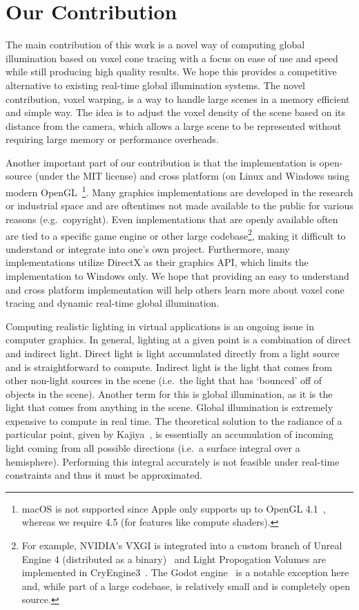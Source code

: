 \section{Our Contribution}
The main contribution of this work is a novel way of computing global illumination based on voxel cone tracing with a focus on ease of use and speed while still producing high quality results. We hope this provides a competitive alternative to existing real-time global illumination systems. The novel contribution, voxel warping, is a way to handle large scenes in a memory efficient and simple way. The idea is to adjust the voxel density of the scene based on its distance from the camera, which allows a large scene to be represented without requiring large memory or performance overheads.

Another important part of our contribution is that the implementation is open-source (under the MIT license) and cross platform (on Linux and Windows using modern OpenGL~\footnote{macOS is not supported since Apple only supports up to OpenGL 4.1~\cite{appleopenglsupport}, whereas we require 4.5 (for features like compute shaders).}. Many graphics implementations are developed in the research or industrial space and are oftentimes not made available to the public for various reasons (e.g.\ copyright). Even implementations that are openly available often are tied to a specific game engine or other large codebase\footnote{For example, NVIDIA's VXGI is integrated into a custom branch of Unreal Engine 4 (distributed as a binary)~\cite{nvidiavxgi} and Light Propogation Volumes are implemented in CryEngine3~\cite{kaplanyan2009light}. The Godot engine~\cite{godotengine} is a notable exception here and, while part of a large codebase, is relatively small and is completely open source.}, making it difficult to understand or integrate into one's own project. Furthermore, many implementations utilize DirectX as their graphics API, which limits the implementation to Windows only. We hope that providing an easy to understand and cross platform implementation will help others learn more about voxel cone tracing and dynamic real-time global illumination.

\iffalse
Computing realistic lighting in virtual applications is an ongoing issue in computer graphics. In general, lighting at a given point is a combination of direct and indirect light. Direct light is light accumulated directly from a light source and is straightforward to compute. Indirect light is the light that comes from other non-light sources in the scene (i.e.\ the light that has `bounced' off of objects in the scene). Another term for this is global illumination, as it is the light that comes from anything in the scene. Global illumination is extremely expensive to compute in real time. The theoretical solution to the radiance of a particular point, given by Kajiya~\cite{kajiya1986rendering}, is essentially an accumulation of incoming light coming from all possible directions (i.e.\ a surface integral over a hemisphere). Performing this integral accurately is not feasible under real-time constraints and thus it must be approximated.

